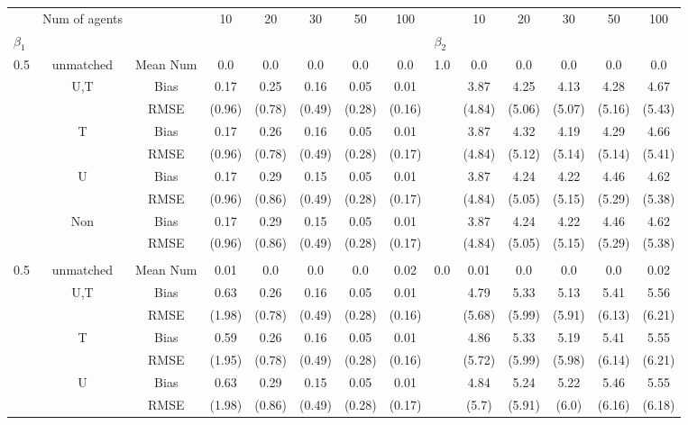 \begin{tabular}{@{\extracolsep{5pt}}lc|cccccc|lccccc}
\toprule 
 & Num of agents &  & 10 & 20 & 30 & 50 & 100 &  & 10 & 20 & 30 & 50 & 100 \\
$\beta_1$ &  &  &  &  &  &  &  & $\beta_2$ &  &  &  &  &  \\
\midrule 
0.5 & unmatched & Mean Num & 0.0 & 0.0 & 0.0 & 0.0 & 0.0 & 1.0 & 0.0 & 0.0 & 0.0 & 0.0 & 0.0 \\
 & U,T & Bias & 0.17 & 0.25 & 0.16 & 0.05 & 0.01 &  & 3.87 & 4.25 & 4.13 & 4.28 & 4.67 \\
 &  & RMSE & (0.96) & (0.78) & (0.49) & (0.28) & (0.16) &  & (4.84) & (5.06) & (5.07) & (5.16) & (5.43) \\
 & T & Bias & 0.17 & 0.26 & 0.16 & 0.05 & 0.01 &  & 3.87 & 4.32 & 4.19 & 4.29 & 4.66 \\
 &  & RMSE & (0.96) & (0.78) & (0.49) & (0.28) & (0.17) &  & (4.84) & (5.12) & (5.14) & (5.14) & (5.41) \\
 & U & Bias & 0.17 & 0.29 & 0.15 & 0.05 & 0.01 &  & 3.87 & 4.24 & 4.22 & 4.46 & 4.62 \\
 &  & RMSE & (0.96) & (0.86) & (0.49) & (0.28) & (0.17) &  & (4.84) & (5.05) & (5.15) & (5.29) & (5.38) \\
 & Non & Bias & 0.17 & 0.29 & 0.15 & 0.05 & 0.01 &  & 3.87 & 4.24 & 4.22 & 4.46 & 4.62 \\
 &  & RMSE & (0.96) & (0.86) & (0.49) & (0.28) & (0.17) &  & (4.84) & (5.05) & (5.15) & (5.29) & (5.38) \\
 &  &  &  &  &  &  &  &  &  &  &  &  &  \\
0.5 & unmatched & Mean Num & 0.01 & 0.0 & 0.0 & 0.0 & 0.02 & 0.0 & 0.01 & 0.0 & 0.0 & 0.0 & 0.02 \\
 & U,T & Bias & 0.63 & 0.26 & 0.16 & 0.05 & 0.01 &  & 4.79 & 5.33 & 5.13 & 5.41 & 5.56 \\
 &  & RMSE & (1.98) & (0.78) & (0.49) & (0.28) & (0.16) &  & (5.68) & (5.99) & (5.91) & (6.13) & (6.21) \\
 & T & Bias & 0.59 & 0.26 & 0.16 & 0.05 & 0.01 &  & 4.86 & 5.33 & 5.19 & 5.41 & 5.55 \\
 &  & RMSE & (1.95) & (0.78) & (0.49) & (0.28) & (0.16) &  & (5.72) & (5.99) & (5.98) & (6.14) & (6.21) \\
 & U & Bias & 0.63 & 0.29 & 0.15 & 0.05 & 0.01 &  & 4.84 & 5.24 & 5.22 & 5.46 & 5.55 \\
 &  & RMSE & (1.98) & (0.86) & (0.49) & (0.28) & (0.17) &  & (5.7) & (5.91) & (6.0) & (6.16) & (6.18) \\

\end{tabular}

